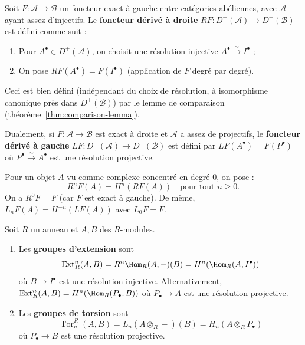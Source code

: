 \begin{definition}\label{def:right-derived}
Soit $F \colon \mathcal{A} \to \mathcal{B}$ un foncteur exact à gauche
entre catégories abéliennes, avec $\mathcal{A}$ ayant assez d'injectifs.
Le \textbf{foncteur dérivé à droite} $RF \colon D^+(\mathcal{A}) \to D^+(\mathcal{B})$
est défini comme suit :
\begin{enumerate}[label=\arabic*.]
\item Pour $A^\bullet \in D^+(\mathcal{A})$, on choisit une résolution
  injective $A^\bullet \xrightarrow{\sim} I^\bullet$ ;
\item On pose $RF(A^\bullet) = F(I^\bullet)$
  (application de $F$ degré par degré).
\end{enumerate}
Ceci est bien défini (indépendant du choix de résolution, à isomorphisme
canonique près dans $D^+(\mathcal{B})$) par le lemme de comparaison
(théorème~\ref{thm:comparison-lemma}).
\end{definition}

\begin{definition}\label{def:left-derived}
Dualement, si $F \colon \mathcal{A} \to \mathcal{B}$ est exact à droite
et $\mathcal{A}$ a assez de projectifs, le \textbf{foncteur dérivé à gauche}
$LF \colon D^-(\mathcal{A}) \to D^-(\mathcal{B})$ est défini par
$LF(A^\bullet) = F(P^\bullet)$ où $P^\bullet \xrightarrow{\sim} A^\bullet$
est une résolution projective.
\end{definition}

\begin{definition}\label{def:classical-derived}
Pour un objet $A$ vu comme complexe concentré en degré $0$, on pose :
\[
  R^n F(A) = H^n(RF(A)) \quad \text{pour tout } n \geq 0.
\]
On a $R^0 F = F$ (car $F$ est exact à gauche). De même,
$L_n F(A) = H^{-n}(LF(A))$ avec $L_0 F = F$.
\end{definition}

\begin{definition}%
\label{def:ext-tor}
Soit $R$ un anneau et $A, B$ des $R$-modules.
\begin{enumerate}[label=(\roman*)]
\item Les \textbf{groupes d'extension} sont
\[
  \operatorname{Ext}_R^n(A, B) = R^n \Hom_R(A, -)(B)
  = H^n(\Hom_R(A, I^\bullet))
\]
où $B \to I^\bullet$ est une résolution injective.
Alternativement,
$\operatorname{Ext}_R^n(A, B) = H^n(\Hom_R(P_\bullet, B))$
où $P_\bullet \to A$ est une résolution projective.

\item Les \textbf{groupes de torsion} sont
\[
  \operatorname{Tor}_n^R(A, B) = L_n(A \otimes_R -)(B)
  = H_n(A \otimes_R P_\bullet)
\]
où $P_\bullet \to B$ est une résolution projective.
\end{enumerate}
\end{definition}

